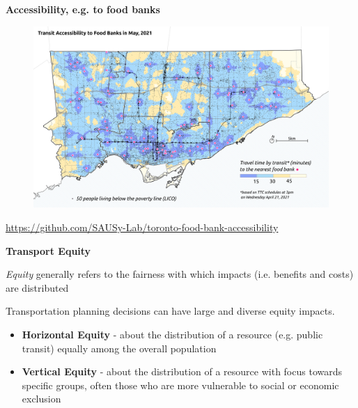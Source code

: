 \documentclass[aspectratio=169]{beamer}
\begin{document}
\begin{frame}
	
	\textbf{Accessibility, e.g. to food banks}
	
	\begin{figure}
		\centering
		\includegraphics[width=0.94\linewidth]{images/foodbanks_access.png}
	\end{figure}
	
	\tiny 
	\url{https://github.com/SAUSy-Lab/toronto-food-bank-accessibility}
	
\end{frame}












\begin{frame}
	
	\textbf{Transport Equity}
	
	\vspace{4mm}
	
	
	\textit{Equity} generally refers to the fairness with which impacts (i.e. benefits and costs) are distributed 
	
	\vspace{2mm}
	
	Transportation planning decisions can have large and diverse equity
	impacts.
	
	\vspace{2mm}
	
	
	\begin{itemize}	
		\item \textbf{Horizontal Equity} - about the distribution of a resource (e.g. public transit) equally among the overall population
		
		\item \textbf{Vertical Equity} - about the distribution of a resource with focus towards specific groups, often those who are more vulnerable to social or economic exclusion
	\end{itemize}
	
	
\end{frame}
\end{document}
